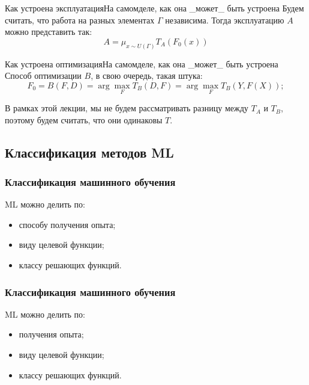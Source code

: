\documentclass[14pt, fleqn, xcolor={dvipsnames, table}]{beamer}
\begin{document}
\begin{frame}{Как устроена эксплуатация}{На самомделе, как она \_может\_ быть устроена}
Будем считать, что работа на разных элементах $\Gamma$ независима. Тогда эксплуатацию $A$ можно представить так:
$$
A=\mu_{x \sim U(\Gamma)} T_A(F_0(x))
$$
\end{frame}

\begin{frame}{Как устроена оптимизация}{На самомделе, как она \_может\_ быть устроена}
Способ оптимизации $B$, в свою очередь, такая штука:
$$
F_0 = B(F, D) = \arg \max_{F} T_B(D, F) = \arg \max_{F} T_B(Y,F(X));
$$

В рамках этой лекции, мы не будем рассматривать разницу между $T_A$ и $T_B$, поэтому будем считать, что они одинаковы $T$.
\end{frame}

\subsection{Классификация методов ML}
\begin{frame}
\frametitle{Классификация машинного обучения}
ML можно делить по:
\begin{itemize}
	\item способу получения опыта;
	\item виду целевой функции;
	\item классу решающих функций.
\end{itemize}
\end{frame}

\begin{frame}
\frametitle{Классификация машинного обучения}
ML можно делить по:
\begin{itemize}
	\item { получения опыта;}
	\item виду целевой функции;
	\item классу решающих функций.
\end{itemize}
\end{frame}
\end{document}
